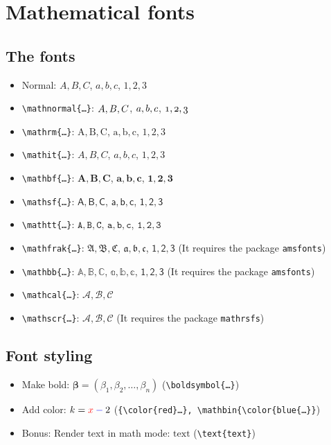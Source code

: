 \documentclass{article}
\begin{document}
\section{Mathematical fonts}

\subsection{The fonts}

\begin{itemize}
	\item Normal: $A,B,C$, $a,b,c$, $1,2,3$
	\item \verb|\mathnormal{…}|: $\mathnormal{A,B,C}$, $\mathnormal{a,b,c}$, $\mathnormal{1,2,3}$
	\item \verb|\mathrm{…}|: $\mathrm{A,B,C}$, $\mathrm{a,b,c}$, $\mathrm{1,2,3}$
	\item \verb|\mathit{…}|: $\mathit{A,B,C}$, $\mathit{a,b,c}$, $\mathit{1,2,3}$
	\item \verb|\mathbf{…}|: $\mathbf{A,B,C}$, $\mathbf{a,b,c}$, $\mathbf{1,2,3}$	
	\item \verb|\mathsf{…}|: $\mathsf{A,B,C}$, $\mathsf{a,b,c}$, $\mathsf{1,2,3}$
	\item \verb|\mathtt{…}|: $\mathtt{A,B,C}$, $\mathtt{a,b,c}$, $\mathtt{1,2,3}$
	\item \verb|\mathfrak{…}|: $\mathfrak{A,B,C}$, $\mathfrak{a,b,c}$, $\mathsf{1,2,3}$ (It requires the package \verb|amsfonts|)
	\item \verb|\mathbb{…}|: $\mathbb{A,B,C}$, $\mathbb{a,b,c}$, $\mathsf{1,2,3}$ (It requires the package \verb|amsfonts|)
	\item \verb|\mathcal{…}|: $\mathcal{A,B,C}$
	\item \verb|\mathscr{…}|: $\mathscr{A,B,C}$ (It requires the package \verb|mathrsfs|)
\end{itemize}

\subsection{Font styling}

\begin{itemize}
	\item Make bold: $\boldsymbol{\beta} = (\beta_1,\beta_2,\dotsc,\beta_n)$ (\verb|\boldsymbol{…}|)
	\item Add color: $k = {\color{red}x} \mathbin{\color{blue}{-}} 2$ (\verb|{\color{red}…}, \mathbin{\color{blue{…}}|)
	\item Bonus: Render text in math mode: $\text{text}$ (\verb|\text{text}|)
\end{itemize}
\end{document}
